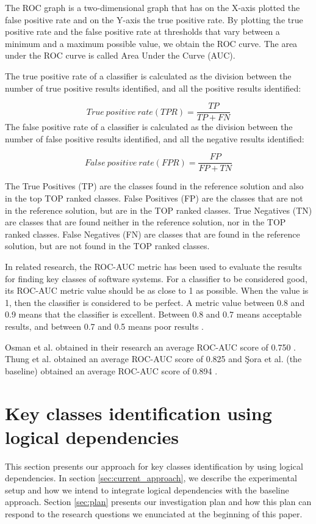 \documentclass[runningheads]{comsis2}
\begin{document}
The ROC graph is a two-dimensional graph that has on the X-axis plotted the false positive rate and on the Y-axis the true positive rate. By plotting the true positive rate and the false positive rate at thresholds that vary between a minimum and a maximum possible value, we obtain the ROC curve. The area under the ROC curve is called Area Under the Curve (AUC).

The true positive rate of a classifier is calculated as the division between the number of true positive results identified, and all the positive results identified:

\begin{equation}
 True\ positive\ rate (TPR) = \frac{TP}{TP+FN}
\end{equation}
The false positive rate of a classifier is calculated as the division between the number of false positive results identified, and all the negative results identified:

\begin{equation}
 False\ positive\ rate (FPR) = \frac{FP}{FP+TN}
\end{equation}

The True Positives (TP) are the classes found in the reference solution and also in the top TOP ranked classes. False Positives (FP) are the classes that are not in the reference solution, but are in the TOP ranked classes.
True Negatives (TN) are classes that are found neither in the reference solution, nor in the TOP ranked classes. False Negatives (FN) are classes that are found in the reference solution, but are not found in the TOP ranked classes.

In related research, the ROC-AUC metric has been used to evaluate the results for finding key classes of software systems.
For a classifier to be considered good, its ROC-AUC metric value should be as close to 1 as possible.
When the value is 1, then the classifier is considered to be perfect. A metric value between 0.8 and 0.9 means that the classifier is excellent. Between 0.8 and 0.7 means acceptable results, and between 0.7 and 0.5 means poor results \cite{ROC_METRIC_VALS}. 

Osman et al. obtained in their research an average ROC-AUC score of 0.750 \cite{6676885}. Thung et al. obtained an average ROC-AUC score of 0.825 \cite{rocclasification}  and Şora et al. (the baseline) obtained an average ROC-AUC score of 0.894 \cite{Finding-key-classes}.



\section{Key classes identification using logical dependencies}
\label{sec:keycalss_identification}
This section presents our approach for key classes identification by using logical dependencies. 
In section \ref{sec:current_approach}, we describe the experimental setup and how we intend to integrate logical dependencies with the baseline approach. 
Section \ref{sec:plan} presents our investigation plan and how this plan can respond to the research questions we enunciated at the beginning of this paper.
\end{document}
